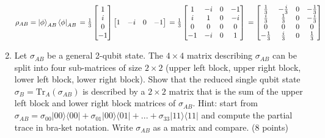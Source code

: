 \documentclass{article}
\begin{document}
\begin{enumerate}
          $\rho_{AB}
              \\= \ket{\phi}_{AB}\bra{\phi}_{AB}
              \\=\frac{1}{3}\begin{bmatrix}
                  1 \\ i \\ 0 \\ -1 \\
              \end{bmatrix}\begin{bmatrix}
                  1 & -i & 0 & -1 \\
              \end{bmatrix}
              \\=\frac{1}{3}\begin{bmatrix}
                  1  & -i & 0 & -1 \\
                  i  & 1  & 0 & -i \\
                  0  & 0  & 0 & 0  \\
                  -1 & -i & 0 & 1  \\
              \end{bmatrix}
              \\= \begin{bmatrix}
                  \frac{1}{3}  & -\frac{i}{3} & 0 & -\frac{1}{3} \\
                  \frac{i}{3}  & \frac{1}{3}  & 0 & -\frac{i}{3} \\
                  0            & 0            & 0 & 0            \\
                  -\frac{1}{3} & \frac{i}{3}  & 0 & \frac{1}{3}  \\
              \end{bmatrix}
          $

    \item Let $\sigma_{AB}$ be a general 2-qubit state. The $4\times4$ matrix describing $\sigma_{AB}$ can be split into four sub-matrices of size $2\times2$ (upper left block, upper right block, lower left block, lower right block). Show that the reduced single qubit state $\sigma_B = \mathrm{Tr}_A(\sigma_{AB})$ is described by a $2\times2$ matrix that is the sum of the upper left block and lower right block matrices of $\sigma_{AB}$. Hint: start from $\sigma_{AB} = \sigma_{00}|00\rangle\langle00| + \sigma_{01}|00\rangle\langle01| + ... + \sigma_{33}|11\rangle\langle11|$ and compute the partial trace in bra-ket notation. Write $\sigma_{AB}$ as a matrix and compare. (8 points)


\end{enumerate}
\end{document}
